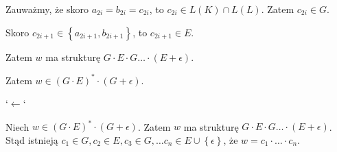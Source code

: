 \documentclass{article}
\theoremstyle{definition}
\theoremstyle{remark}
\begin{document}
Zauważmy, że skoro \(a_{2i}=b_{2i}=c_{2i}\), to \(c_{2i} \in L(K) \cap L(L)\). Zatem \(c_{2i} \in G\).

Skoro \(c_{2i+1} \in \left\{ a_{2i+1}, b_{2i+1} \right\}\), to \(c_{2i+1} \in E\).

Zatem \(w\) ma strukturę \(G \cdot E \cdot G \ldots \cdot \left( E + \epsilon \right)\).

Zatem \(w \in \left( G \cdot E \right)^* \cdot \left( G + \epsilon \right)\).

`\( \leftarrow \)`

Niech \(w \in \left( G \cdot E \right)^* \cdot \left( G + \epsilon \right)\). Zatem \(w\) ma strukturę \(G \cdot E \cdot G \ldots \cdot \left( E + \epsilon \right)\). 
Stąd istnieją \(c_1 \in G, c_2 \in E, c_3 \in G, \ldots c_n \in E \cup \left\{ \epsilon \right\}\), że \(w = c_1 \cdot \ldots \cdot c_n\).
\end{document}
